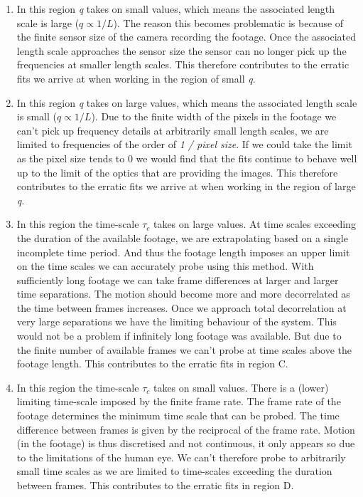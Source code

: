 \documentclass[11pt]{article}
\begin{document}
\begin{enumerate}[label=(\Alph*)]
\item In this region \textit{q} takes on small values, which means the associated length scale is large ($q \propto 1 / L$). The reason this becomes problematic is because of the finite sensor size of the camera recording the footage. Once the associated length scale approaches the sensor size the sensor can no longer pick up the frequencies at smaller length scales. This therefore contributes to the erratic fits we arrive at when working in the region of small \textit{q}.
     
\item In this region \textit{q} takes on large values, which means the associated length scale is small ($q \propto 1 / L$). Due to the finite width of the pixels in the footage we can't pick up frequency details at arbitrarily small length scales, we are limited to frequencies of the order of \textit{1 / pixel size}. If we could take the limit as the pixel size tends to 0 we would find that the fits continue to behave well up to the limit of the optics that are providing the images. This therefore contributes to the erratic fits we arrive at when working in the region of large \textit{q}.

\item In this region the time-scale $\tau_c$ takes on large values. At time scales exceeding the duration of the available footage, we are extrapolating based on a single incomplete time period. And thus the footage length imposes an upper limit on the time scales we can accurately probe using this method. With sufficiently long footage we can take frame differences at larger and larger time separations. The motion should become more and more decorrelated as the time between frames increases. Once we approach total decorrelation at very large separations we have the limiting behaviour of the system. This would not be a problem if infinitely long footage was available. But due to the finite number of available frames we can't probe at time scales above the footage length. This contributes to the erratic fits in region C.

\item In this region the time-scale $\tau_c$ takes on small values. There is a (lower) limiting time-scale imposed by the finite frame rate. The frame rate of the footage determines the minimum time scale that can be probed. The time difference between frames is given by the reciprocal of the frame rate. Motion (in the footage) is thus discretised and not continuous, it only appears so due to the limitations of the human eye. We can't therefore probe to arbitrarily small time scales as we are limited to time-scales exceeding the duration between frames. This contributes to the erratic fits in region D.


\end{enumerate}
\end{document}
